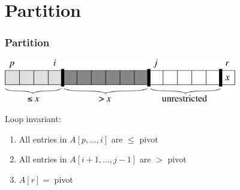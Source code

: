 \documentclass{beamer}
\newcommand{\ii}{\item}
\newcommand{\sect}[1]{
\section{#1}
\begin{frame}[fragile]\frametitle{#1}
}
\begin{document}
%  
%

\sect{Partition}

\includegraphics[width=4in]{Fig-7-2.pdf}

\vfill
 Loop invariant:
\begin{enumerate}
  \ii All entries in $A[p,...,i]$ are $\leq$ pivot
  \ii All entries in $A[i+1,...,j-1]$ are $>$ pivot
  \ii $A[r] =$ pivot
\end{enumerate}

\end{frame}
\end{document}
